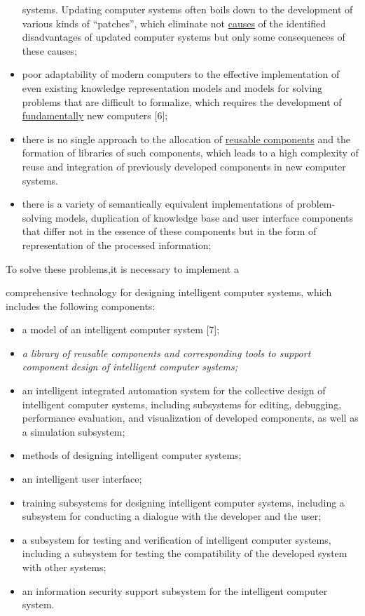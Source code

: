 \documentclass{article}
\begin{document}
\begin{multicols}{2}
\begin{itemize}[noitemsep]
systems. Updating computer systems often boils
down to the development of various kinds of
“patches”, which eliminate not \uline{causes} of the identified disadvantages of updated computer systems
but only some consequences of these causes;
\item poor adaptability of modern computers to the effective implementation of even existing knowledge
representation models and models for solving problems that are difficult to formalize, which requires
the development of \uline{fundamentally} new computers
[6];
\item there is no single approach to the allocation of
\uline{reusable components} and the formation of libraries
of such components, which leads to a high complexity of reuse and integration of previously developed
components in new computer systems.
\item there is a variety of semantically equivalent implementations of problem-solving models, duplication
of knowledge base and user interface components
that differ not in the essence of these components
but in the form of representation of the processed
information;


\end{itemize}
To solve these problems,it is necessary to implement a
\newpage

\columnbreak

comprehensive technology for designing intelligent computer systems, which includes the following components:
\begin{itemize}[noitemsep]
\item a model of an intelligent computer system [7];
\item \textit{a library of reusable components and corresponding
tools to support component design of intelligent
computer systems;}
\item  an intelligent integrated automation system for the
collective design of intelligent computer systems,
including subsystems for editing, debugging, performance evaluation, and visualization of developed
components, as well as a simulation subsystem;
\item methods of designing intelligent computer systems;
\item an intelligent user interface;
\item training subsystems for designing intelligent computer systems, including a subsystem for conducting
a dialogue with the developer and the user;
\item a subsystem for testing and verification of intelligent
computer systems, including a subsystem for testing
the compatibility of the developed system with other
systems;
\item an information security support subsystem for the
intelligent computer system.\par


\end{itemize}
\end{multicols}
\end{document}
